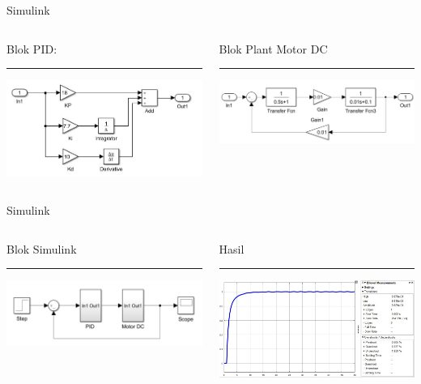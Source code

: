 \documentclass[10pt,xcolor={dvipsnames}]{beamer}
\begin{document}
\begin{frame}{Simulink}
	\begin{columns}[T] %
		\begin{column}{0.48\textwidth}
			Blok PID:
			\color{black}\rule{\linewidth}{4pt}
			\includegraphics[width=7.5cm]{Matlab/simulink2.jpg}
		\end{column}%
		\hfill%
		\begin{column}{0.48\textwidth}
			Blok Plant Motor DC
			\color{blue}\rule{\linewidth}{4pt}
			\begin{center}
				\includegraphics[width=7.5cm]{Matlab/simulink3.jpg}
			\end{center}
		\end{column}
	\end{columns}
\end{frame}

\begin{frame}{Simulink}
	\begin{columns}[T] %
		\begin{column}{0.48\textwidth}
			Blok Simulink
			\color{black}\rule{\linewidth}{4pt}
			\includegraphics[width=7.5cm]{Matlab/simulink1.jpg}
		\end{column}%
		\hfill%
		\begin{column}{0.48\textwidth}
			Hasil
			\color{blue}\rule{\linewidth}{4pt}
			\begin{center}
				\includegraphics[width=7.5cm]{Matlab/simulink4.jpg}
			\end{center}
		\end{column}
	\end{columns}
\end{frame}
\end{document}
